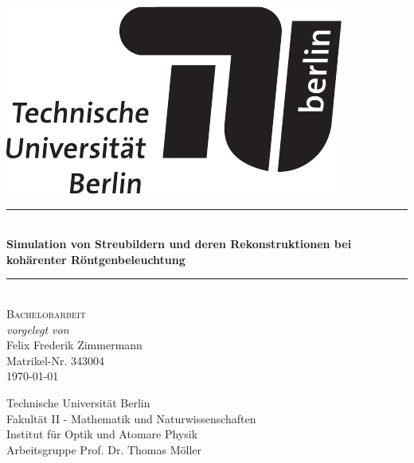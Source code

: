 \begin{titlepage}

\begin{center}


\begin{flushright}
\includegraphics[width=.3\textwidth]{./images/TU_Logo.pdf}\\[2.5cm]    
\end{flushright}




\newcommand{\HRule}{\rule{\linewidth}{0.5mm}}
\HRule \\[0.4cm]
{ \huge \bfseries Simulation von Streubildern und deren Rekonstruktionen bei kohärenter Röntgenbeleuchtung}\\[0.4cm]

\HRule \\[1.5cm]

\textsc{\Large Bachelorarbeit}\\[0.5cm]

\emph{vorgelegt von}\\
Felix Frederik Zimmermann\\
Matrikel-Nr. 343004\\[0.5cm]
{\large \today}


\vfill

Technische Universität Berlin\\
Fakultät II - Mathematik und Naturwissenschaften\\
Institut für Optik und Atomare Physik\\
Arbeitsgruppe Prof. Dr. Thomas Möller\\

\end{center}

\end{titlepage}